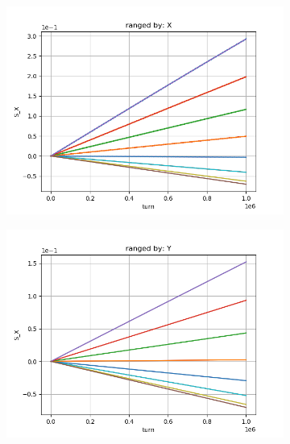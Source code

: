 \documentclass{article}
\begin{document}
\begin{figure}[!ht]
  \centering
  \begin{subfigure}[b]{1\textwidth}
    \includegraphics{img/S_X_vs_iteration_1_ranged_X}
  \end{subfigure}
  \begin{subfigure}[b]{1\textwidth}
    \includegraphics{img/S_X_vs_iteration_1_ranged_Y}
  \end{subfigure}
\end{figure}
\end{document}
